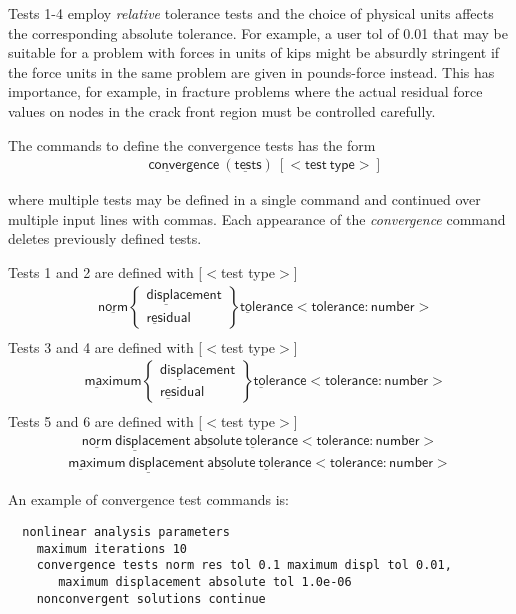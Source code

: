 \documentclass[11pt]{report}
\numberwithin{equation}{section}
\newcommand{\nin} {\noindent}
\newcommand{\ul} {\underline}
\newcommand{\hv} {\mathsf}   %
\newcommand{\ti}{\emph}
\begin{document}
Tests 1-4 employ  \ti{relative} tolerance tests and the choice of physical units 
affects the corresponding absolute tolerance. For example, a user tol of 0.01 
that may be suitable for a problem with forces in units of kips might be absurdly 
stringent if the force units in the same problem are given in pounds-force instead. 
This has importance, for example, in fracture problems where the actual 
residual force values on nodes in the crack front region must be controlled carefully.

The  commands to define the convergence tests has the form
\begin{align*}
&\hv{\ul{conver}gence\ (\ul{test}s)\ \left[ <test\ type> \right]}
\end{align*}

\nin where multiple tests may be defined in a single command and 
continued over multiple input lines with commas. Each appearance of the
\ti{convergence} command deletes previously defined tests.

Tests 1 and 2 are defined with [$<$test type$>$]
\begin{align*}
& \hv{ \ul{norm} }
\begin{Bmatrix} 
\hv{ \ul{displac}ement} \\ \hv{\ul{res}idual }
\end{Bmatrix}
\hv{ \ul{tol}erance <tolerance:number> }\\ 
\end{align*}
Tests 3 and 4 are defined with [$<$test type$>$]
\begin{align*}
& \hv{ \ul{max}imum }
\begin{Bmatrix} 
\hv{ \ul{displac}ement} \\ \hv{\ul{res}idual }
\end{Bmatrix}
\hv{ \ul{tol}erance <tolerance:number> }\\ 
\end{align*}
Tests 5 and 6 are defined with [$<$test type$>$]
\begin{align*}
\hv{ \ul{norm}\ \ul{displac}ement\ \ul{absol}ute\  \ul{tol}erance <tolerance:number> }
\end{align*}
\begin{align*}
\hv{ \ul{max}imum\ \ul{displac}ement\ \ul{absol}ute\  \ul{tol}erance <tolerance:number> }
\end{align*}

\nin An example of 
convergence test commands is:
\small
\begin{verbatim}
  nonlinear analysis parameters
    maximum iterations 10
    convergence tests norm res tol 0.1 maximum displ tol 0.01,
       maximum displacement absolute tol 1.0e-06
    nonconvergent solutions continue
\end{verbatim}
\normalsize
\end{document}
